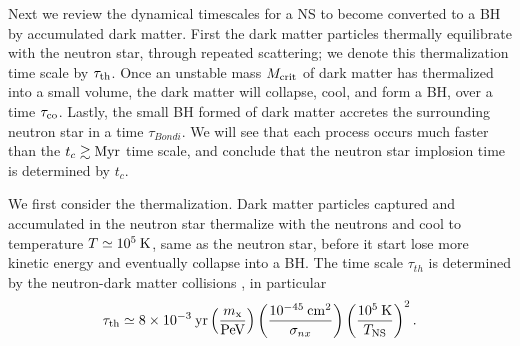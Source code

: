 \documentclass[nofootinbib,longbibliography,prd,floatfix,superscriptaddress,twocolumn]{revtex4-1}
\begin{document}
Next we review the dynamical timescales for a NS to become converted to a BH by accumulated dark matter. First the dark matter particles thermally equilibrate with the neutron star, through repeated scattering; we denote this thermalization time scale by $\tau_{\rm th}$. Once an unstable mass $M_{\rm crit}$ of dark matter has thermalized into a small volume, the dark matter will collapse, cool, and form a BH, over a time $\tau_{\rm co}$. Lastly, the small BH formed of dark matter accretes the surrounding neutron star in a time $\tau_{Bondi}$. We will see that each process occurs much faster than the $t_c \gtrsim {\rm Myr}$ time scale, and conclude that the neutron star implosion time is determined by $t_c$.

We first consider the thermalization. Dark matter particles captured and accumulated in the neutron star thermalize with the neutrons and cool to temperature $T\simeq 10^5 \rm\:K$, same as the neutron star, before it start lose more kinetic energy and eventually collapse into a BH. The time scale $\tau_{th}$ is determined by the neutron-dark matter collisions \cite{Bertoni:2013bsa}, in particular
\begin{align}
\tau_{\rm th} 
\simeq
8 \times 10^{-3} {\:\rm yr}\left(\frac{m_{\rm x}}{{\rm PeV}}\right)
\left(\frac{10^{-45}{\rm\:cm^2}}{\sigma_{nx}}\right)\left(\frac{10^5 {\rm\:K}}{T_{\rm NS}}\right)^2.
\end{align}
\end{document}
